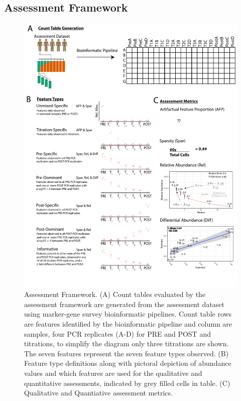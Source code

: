 \documentclass{bmcart}
\begin{document}
\subsection*{Assessment Framework}
\begin{figure}
\centering
\includegraphics{AssessmentFramework.pdf}
\caption{\label{fig:assessmentFramework}Assessment Framework. (A) Count tables evaluated by the assessment framework are generated from the assessment dataset using marker-gene survey bioinformatic pipelines. Count table rows are features identified by the bioinformatic pipeline and column are samples, four PCR replicates (A-D) for PRE and POST and titrations, to simplify the diagram only three titrations are shown.  The seven features represent the seven feature types observed. (B) Feature type definitions along with pictoral depiction of abundance values and which features are used for the qualitative and quantitative assessments, indicated by grey filled cells in table. (C) Qualitative and Quantiative assessment metrics.}
\end{figure}
\end{document}
